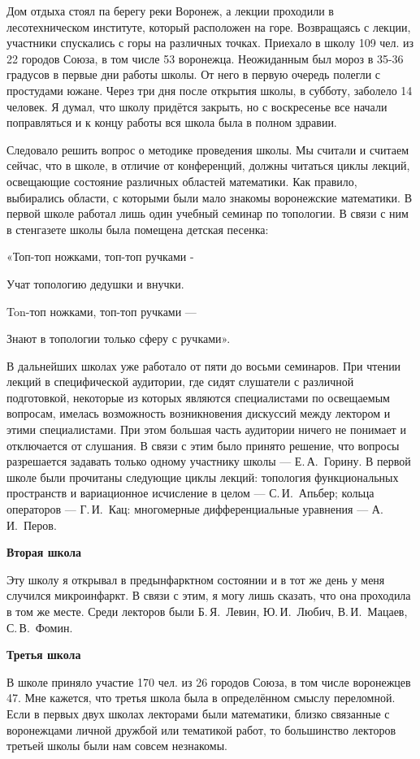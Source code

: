 Дом отдыха стоял па берегу реки Воронеж, а лекции проходили в лесотехническом институте, который расположен на горе. Возвращаясь с лекции, участники спускались с горы на различных точках. Приехало в школу 109 чел. из 22 городов Союза, в том числе 53 воронежца. Неожиданным был мороз в 35-36 градусов в первые дни работы школы. От него в первую очередь полегли с простудами южане. Через три дня после открытия школы, в субботу, заболело 14 человек. Я думал, что школу придётся закрыть, но с воскресенье все начали поправляться и к концу работы вся школа была в полном здравии.

Следовало решить вопрос о методике проведения школы. Мы считали и считаем сейчас, что в школе, в отличие от конференций, должны читаться циклы лекций, освещающие состояние различных областей математики. Как правило, выбирались области, с которыми были мало знакомы воронежские математики.
В первой школе работал лишь один учебный семинар по топологии. В связи с ним в стенгазете школы была помещена детская песенка:

«Топ-топ ножками, топ-топ ручками -

Учат топологию дедушки и внучки.

Ton-топ ножками, топ-топ ручками —

Знают в топологии только сферу с ручками».

В дальнейших школах уже работало от пяти до восьми семинаров. При чтении лекций в специфической аудитории, где сидят слушатели с различной подготовкой, некоторые из которых являются специалистами по освещаемым вопросам, имелась возможность возникновения дискуссий между лектором и этими специалистами. При этом большая часть аудитории ничего не понимает и отключается от слушания. В связи с этим было принято решение, что вопросы разрешается задавать только одному участнику школы --- Е.\,А.~Горину.
В первой школе были прочитаны следующие циклы лекций: топология функциональных пространств и вариационное исчисление в целом --- С.\,И.~Апьбер; кольца операторов --- Г.\,И.~Кац: многомерные дифференциальные уравнения --- А.\,И.~Перов.

{\bf Вторая школа}

Эту школу я открывал в предынфарктном состоянии и в тот же день у меня случился микроинфаркт.
В связи с этим, я могу лишь сказать, что она проходила в том же месте. Среди лекторов были Б.\,Я.~Левин, Ю.\,И.~Любич, В.\,И.~Мацаев, С.\,В.~Фомин.

{\bf Третья школа}

В школе приняло участие 170 чел. из 26 городов Союза, в том числе воронежцев 47. Мне кажется, что третья школа была в определённом смыслу переломной. Если в первых двух школах лекторами были математики, близко связанные с воронежцами личной дружбой или тематикой работ, то большинство лекторов третьей школы были нам совсем незнакомы.


